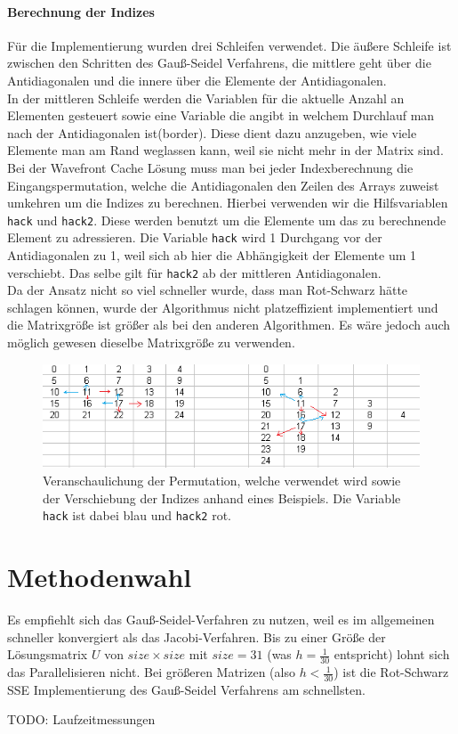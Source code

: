 \documentclass{article}
\begin{document}
\paragraph{Berechnung der Indizes}
Für die Implementierung wurden drei Schleifen verwendet. Die äußere Schleife ist zwischen den Schritten des Gauß-Seidel Verfahrens, die mittlere geht über die Antidiagonalen und die innere über die Elemente der Antidiagonalen. \\
In der mittleren Schleife werden die Variablen für die aktuelle Anzahl an Elementen gesteuert sowie eine Variable die angibt in welchem Durchlauf man nach der Antidiagonalen ist(border). Diese dient dazu anzugeben, wie viele Elemente man am Rand weglassen kann, weil sie nicht mehr in der Matrix sind.\\
Bei der Wavefront Cache Lösung muss man bei jeder Indexberechnung die Eingangspermutation, welche die Antidiagonalen den Zeilen des Arrays zuweist umkehren um die Indizes zu berechnen. Hierbei verwenden wir die Hilfsvariablen \texttt{hack} und \texttt{hack2}. Diese werden benutzt um die Elemente um das zu berechnende Element zu adressieren. Die Variable \texttt{hack} wird 1 Durchgang vor der Antidiagonalen zu 1, weil sich ab hier die Abhängigkeit der Elemente um 1 verschiebt. Das selbe gilt für \texttt{hack2} ab der mittleren Antidiagonalen. \\
Da der Ansatz nicht so viel schneller wurde, dass man Rot-Schwarz hätte schlagen können, wurde der Algorithmus nicht platzeffizient implementiert und die Matrixgröße ist größer als bei den anderen Algorithmen. Es wäre jedoch auch möglich gewesen dieselbe Matrixgröße zu verwenden.

\begin{figure}[h] 
  \centering
     \includegraphics[width=1\textwidth]{bilder/hack.png}
  \caption{Veranschaulichung der Permutation, welche verwendet wird sowie der Verschiebung der Indizes anhand eines Beispiels. Die Variable \texttt{hack} ist dabei blau und \texttt{hack2} rot.}
  \label{fig:Bild6}
\end{figure}

\section{Methodenwahl}
Es empfiehlt sich das Gauß-Seidel-Verfahren zu nutzen, weil es im allgemeinen schneller konvergiert als das Jacobi-Verfahren. Bis zu einer Größe der Lösungsmatrix $U$ von $size \times size$ mit $size = 31$ (was $h=\frac{1}{30}$ entspricht) lohnt sich das Parallelisieren nicht. Bei größeren Matrizen (also $h < \frac{1}{30}$) ist die Rot-Schwarz SSE Implementierung des Gauß-Seidel Verfahrens am schnellsten.

TODO: Laufzeitmessungen
\end{document}
